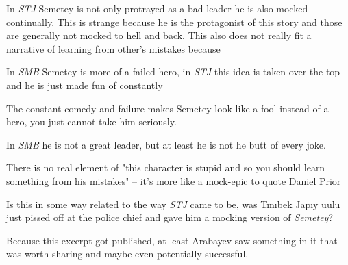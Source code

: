\documentclass[12pt,a4paper]{article}
\newcommand{\Se} {Semetey}
\newcommand{\Mbs}{\emph{SMB}}
\newcommand{\Tj} {Tınıbek Japıy uulu}
\newcommand{\Tjs}{\emph{STJ}}
\newcommand{\Dp} {Daniel Prior}
\begin{document}
In \Tjs{} \Se{} is not only protrayed as a bad leader he is also mocked
continually. This is strange because he is the protagonist of this story and
those are generally not mocked to hell and back. This also does not really fit
a narrative of learning from other's mistakes because 

In \Mbs{} \Se{} is more of a failed hero, in \Tjs{} this idea is taken over the
top and he is just made fun of constantly

The constant comedy and failure makes \Se{} look like a fool instead of a hero,
you just cannot take him seriously.

In \Mbs{} he is not a great leader, but at least he is not he butt of every
joke.

There is no real element of "this character is stupid and so you should learn
something from his mistakes" -- it's more like a mock-epic to quote \Dp{} 

Is this in some way related to the way \Tjs{} came to be, was \Tj{} just pissed
off at the police chief and gave him a mocking version of \emph{\Se{}}? 

Because this excerpt got published, at least Arabayev saw something in it that
was worth sharing and maybe even potentially successful. 
\end{document}
